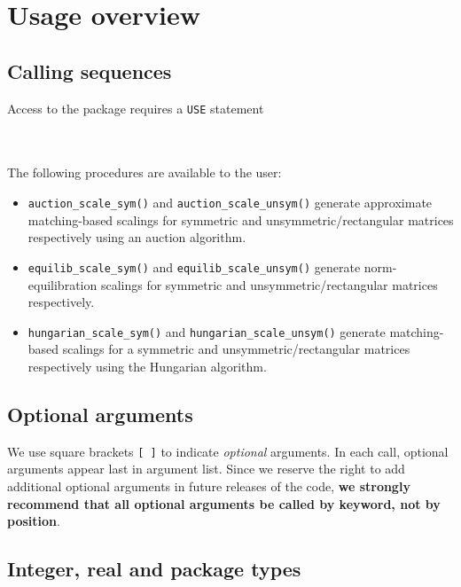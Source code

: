 
\section{Usage overview}

\subsection{Calling sequences}

Access to the package requires a {\tt USE} statement \\ \\
\indent\hspace{8mm}{\tt use spral\_scaling} \\

\medskip

\newpage
\noindent
The following procedures are available to the user:
\begin{itemize}
\item \texttt{auction\_scale\_sym()} and \texttt{auction\_scale\_unsym()} generate approximate matching-based scalings for symmetric and unsymmetric/rectangular matrices respectively using an auction algorithm.
\item \texttt{equilib\_scale\_sym()} and \texttt{equilib\_scale\_unsym()} generate norm-equilibration scalings for symmetric and unsymmetric/rectangular matrices respectively.
\item \texttt{hungarian\_scale\_sym()} and \texttt{hungarian\_scale\_unsym()} generate matching-based scalings for a symmetric and unsymmetric/rectangular matrices respectively using the Hungarian algorithm.
\end{itemize}

\subsection{Optional arguments}

We use square brackets {\tt [ ]} to indicate {\it optional} arguments.
In each
call, optional arguments appear last in argument list.  Since we
reserve the right to add additional optional arguments in future
releases of the code, {\bf we strongly recommend that all optional
arguments be called by keyword, not by position}.

\subsection{Integer, real and package types}


